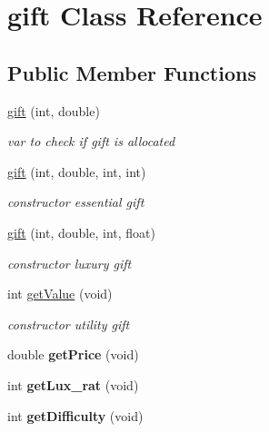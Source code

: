 \hypertarget{classgift}{}\section{gift Class Reference}
\label{classgift}
\subsection*{Public Member Functions}
\begin{DoxyCompactItemize}
\item 
\hyperlink{classgift_a782f5cf6316f6c76061b72cc12c6d95c}{gift} (int, double)
\begin{DoxyCompactList}\small\item\em var to check if gift is allocated \end{DoxyCompactList}\item 
\hyperlink{classgift_a1de4cec7237a45096900754354d1edb6}{gift} (int, double, int, int)
\begin{DoxyCompactList}\small\item\em constructor essential gift \end{DoxyCompactList}\item 
\hyperlink{classgift_ac62aba6ac2db2845c7b60a5496b6de75}{gift} (int, double, int, float)
\begin{DoxyCompactList}\small\item\em constructor luxury gift \end{DoxyCompactList}\item 
\mbox{\label{classgift_a75432abfdbeec0b8880f4f3d265d41a6}} 
int \hyperlink{classgift_a75432abfdbeec0b8880f4f3d265d41a6}{get\+Value} (void)
\begin{DoxyCompactList}\small\item\em constructor utility gift \end{DoxyCompactList}\item 
\mbox{\label{classgift_afb3ea488ce0a02ae622c1acf5608bc94}} 
double {\bfseries get\+Price} (void)
\item 
\mbox{\label{classgift_a680a1bc8854391b628a36faa9568f790}} 
int {\bfseries get\+Lux\+\_\+rat} (void)
\item 
\mbox{\label{classgift_a677b7f1368eef76f344b3a623fdea915}} 
int {\bfseries get\+Difficulty} (void)
\item 

\end{DoxyCompactItemize}
